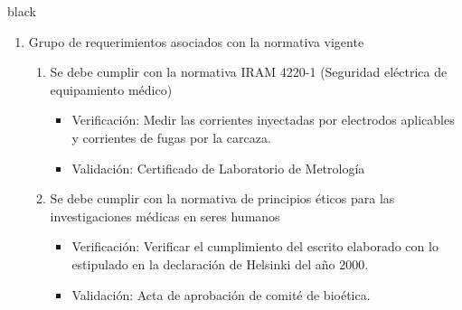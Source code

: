 \documentclass[11pt]{charter}
\begin{document}
\begin{consigna}{black}
\begin{enumerate}
\item Grupo de requerimientos asociados con la normativa vigente
	\begin{enumerate}
	\item Se debe cumplir con la normativa IRAM 4220-1 (Seguridad eléctrica de equipamiento médico)
	\begin{itemize}
		\item Verificación: Medir las corrientes inyectadas por electrodos aplicables y corrientes de fugas por la carcaza.
		\item Validación: Certificado de Laboratorio de Metrología\\
	\end{itemize}
	\item Se debe cumplir con la normativa de principios éticos para las investigaciones médicas en seres humanos
	\begin{itemize}
		\item Verificación: Verificar el cumplimiento del escrito elaborado con lo estipulado en la declaración de Helsinki del año 2000.
		\item Validación: Acta de aprobación de comité de bioética.\\
	\end{itemize}
	\end{enumerate}


\end{enumerate}
\end{consigna}
\end{document}
